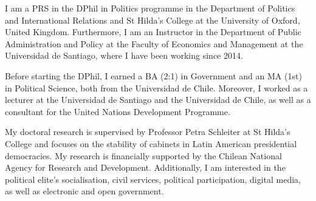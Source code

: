 




\vspace{3mm}

\begin{cvparagraph}

I am a PRS in the DPhil in Politics programme in the Department of Politics and International Relations and St Hilda’s College at the University of Oxford, United Kingdom. Furthermore, I am an Instructor in the Department of Public Administration and Policy at the Faculty of Economics and Management at the Universidad de Santiago, where I have been working since 2014.

Before starting the DPhil, I earned a BA (2:1) in Government and an MA (1st) in Political Science, both from the Universidad de Chile. Moreover, I worked as a lecturer at the Universidad de Santiago and the Universidad de Chile, as well as a consultant for the United Nations Development Programme.

My doctoral research is supervised by Professor Petra Schleiter at St Hilda’s College and focuses on the stability of cabinets in Latin American presidential democracies. My research is financially supported by the Chilean National Agency for Research and Development. Additionally, I am interested in the political elite’s socialisation, civil services, political participation, digital media, as well as electronic and open government.
\vspace{1mm}
\end{cvparagraph}

